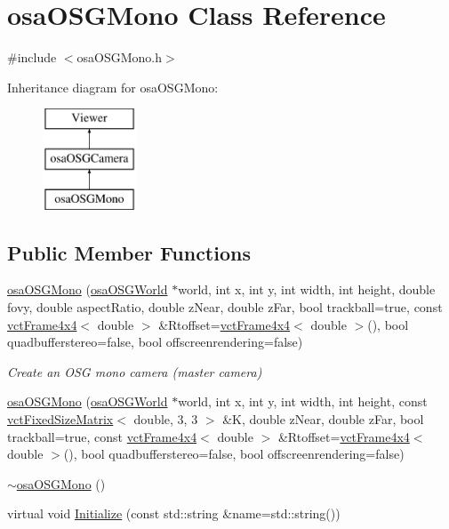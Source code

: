 \hypertarget{classosa_o_s_g_mono}{\section{osa\-O\-S\-G\-Mono Class Reference}
\label{classosa_o_s_g_mono}
}


{\ttfamily \#include $<$osa\-O\-S\-G\-Mono.\-h$>$}

Inheritance diagram for osa\-O\-S\-G\-Mono\-:\begin{figure}[H]
\begin{center}
\leavevmode
\includegraphics[height=3.000000cm]{da/dca/classosa_o_s_g_mono}
\end{center}
\end{figure}
\subsection*{Public Member Functions}
\begin{DoxyCompactItemize}
\item 
\hyperlink{classosa_o_s_g_mono_a9abcbd6f0a354b35b4f6be1a85a5e74d}{osa\-O\-S\-G\-Mono} (\hyperlink{classosa_o_s_g_world}{osa\-O\-S\-G\-World} $\ast$world, int x, int y, int width, int height, double fovy, double aspect\-Ratio, double z\-Near, double z\-Far, bool trackball=true, const \hyperlink{classvct_frame4x4}{vct\-Frame4x4}$<$ double $>$ \&Rtoffset=\hyperlink{classvct_frame4x4}{vct\-Frame4x4}$<$ double $>$(), bool quadbufferstereo=false, bool offscreenrendering=false)
\begin{DoxyCompactList}\small\item\em Create an O\-S\-G mono camera (master camera) \end{DoxyCompactList}\item 
\hyperlink{classosa_o_s_g_mono_aa43c6c373c9ba980dd2e587bdab6159a}{osa\-O\-S\-G\-Mono} (\hyperlink{classosa_o_s_g_world}{osa\-O\-S\-G\-World} $\ast$world, int x, int y, int width, int height, const \hyperlink{classvct_fixed_size_matrix}{vct\-Fixed\-Size\-Matrix}$<$ double, 3, 3 $>$ \&K, double z\-Near, double z\-Far, bool trackball=true, const \hyperlink{classvct_frame4x4}{vct\-Frame4x4}$<$ double $>$ \&Rtoffset=\hyperlink{classvct_frame4x4}{vct\-Frame4x4}$<$ double $>$(), bool quadbufferstereo=false, bool offscreenrendering=false)
\item 
\hyperlink{classosa_o_s_g_mono_a2dc8118fe2fdc4820ad496f8950dc230}{$\sim$osa\-O\-S\-G\-Mono} ()
\item 
virtual void \hyperlink{classosa_o_s_g_mono_aa8c16ff1dd8334526053d6c61ef24d03}{Initialize} (const std\-::string \&name=std\-::string())
\end{DoxyCompactItemize}
